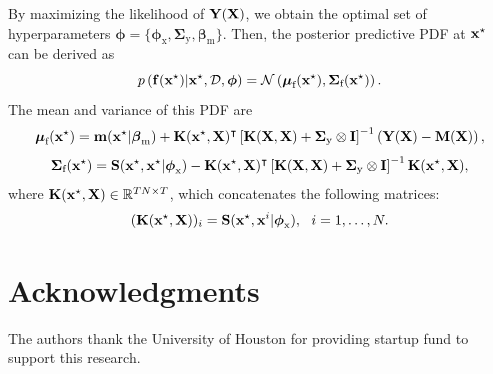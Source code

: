 \documentclass[journal ]{new-aiaa}
\begin{document}
	By maximizing the likelihood of ${\bf Y}({\bf X})$, we obtain the optimal set of hyperparameters $\boldsymbol \phi=\{\boldsymbol \phi_{\text{x}},\boldsymbol{\Sigma}_\text{y},\boldsymbol \beta_{\text{m}}\}$.
	Then, the posterior predictive PDF at ${\bf x}^\star$ can be derived as
	\begin{equation}\label{eqnB4}
		p\left({\bf f}({\bf x}^\star)|{\bf x}^\star,\mathcal{D},\boldsymbol \phi\right) = \mathcal{N}\left(\boldsymbol{\mu}_\text{f}({\bf x}^\star),\boldsymbol{\Sigma}_\text{f}({\bf x}^\star)\right).
	\end{equation}
	The mean and variance of this PDF are
	\begin{equation}\label{eqnB5}
		\boldsymbol{\mu}_\text{f}({\bf x}^\star)={\bf m}({\bf x}^\star|\boldsymbol \beta_{\text{m}})
		+ {\bf K}({\bf x}^\star,{\bf X})^\intercal \left[ {\bf K}({\bf X},{\bf X})+\boldsymbol{\Sigma}_\text{y} \otimes {\bf I}\right]^{-1} \left({\bf Y}({\bf X})-{\bf M} ({\bf X})\right),
	\end{equation}
	\begin{equation}\label{eqnB6}
		\boldsymbol{\Sigma}_\text{f}({\bf x}^\star)={\bf S}({\bf x}^\star,{\bf x}^\star|\boldsymbol \phi_{\text{x}})
		-{\bf K}({\bf x}^\star,{\bf X})^\intercal \left[ {\bf K}({\bf X},{\bf X})+\boldsymbol{\Sigma}_\text{y} \otimes {\bf I}\right]^{-1} {\bf K}({\bf x}^\star,{\bf X}),
	\end{equation}
	where ${\bf K}({\bf x}^\star,{\bf X}) \in \mathbb{R}^{TN \times T}$, which concatenates the following matrices:
	\begin{equation}\label{eqnB7}
		({\bf K}({\bf x}^\star,{\bf X}))_i = {\bf S}({\bf x}^\star,{\bf x}^i|\boldsymbol \phi_{\text{x}}), \ \ i=1,\dots,N.
	\end{equation}
	
	\section*{Acknowledgments}
	The authors thank the University of Houston for providing startup fund to support this research.
	
	\clearpage
	
	
\end{document}
